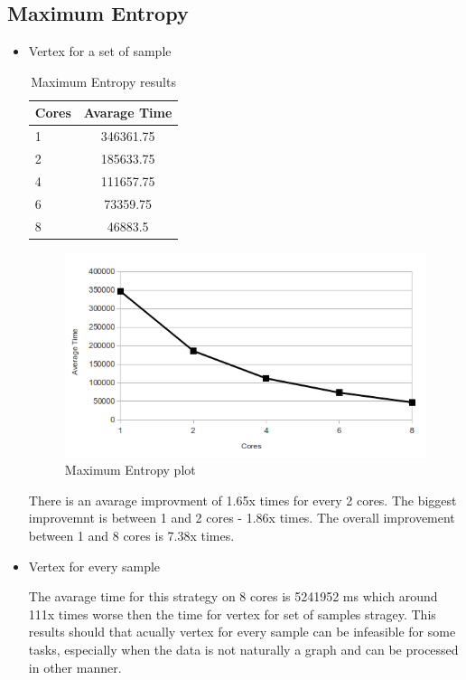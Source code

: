 \documentclass{report}
\begin{document}
\subsection{Maximum Entropy}

\begin{itemize}

\item{Vertex for a set of sample}

\begin{table}[ht]
\centering
\begin{tabular}{ l c }
    \hline\hline
    Cores & Avarage Time \\ [0.2ex]
    \hline
    1 & 346361.75 \\
    2 & 185633.75  \\
    4 &111657.75  \\
    6 & 73359.75  \\
    8 & 46883.5  \\
    \hline
  \end{tabular}
\label{table:maxentres1}
\caption{Maximum Entropy results}
\end{table}

\begin{figure}[!htb]
  \centering
  \includegraphics*[scale=0.70]{maxent_plot.png}
  \caption{Maximum Entropy plot}
  \label{fig:maxent_plot}
\end{figure}

There is an avarage improvment of 1.65x times for every 2 cores. The biggest improvemnt is between 1 and 2 cores - 1.86x times. The overall improvement between 1 and 8 cores is 7.38x times.

\item{Vertex for every sample}

The avarage time for this strategy on 8 cores is 5241952 ms which around 111x times worse then the time for vertex for set of samples stragey. This results should that acually vertex for every sample can be infeasible for some tasks, especially when the data is not naturally a graph and can be processed in other manner.


\end{itemize}
\end{document}
